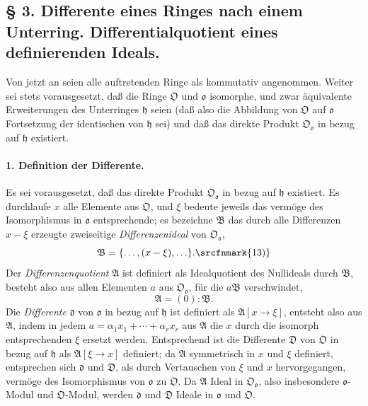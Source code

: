 \subsection*{§ 3. Differente eines Ringes nach einem Unterring. Differentialquotient eines definierenden Ideals.}

Von jetzt an seien alle auftretenden Ringe als kommutativ angenommen. Weiter sei stets vorausgesetzt, daß die Ringe $\mathfrak O$ und $\mathfrak o$ isomorphe, und zwar äquivalente Erweiterungen des Unterringes $\mathfrak h$ seien (daß also die Abbildung von $\mathfrak O$ auf $\mathfrak o$ Fortsetzung der identischen von $\mathfrak h$ sei) und daß das direkte Produkt $\mathfrak O_{\mathfrak o}$ in bezug auf $\mathfrak h$ existiert.

\paragraph{1. Definition der Differente.}
Es sei vorausgesetzt, daß das direkte Produkt $\mathfrak O_{\mathfrak o}$ in bezug auf $\mathfrak h$ existiert. Es durchlaufe $x$ alle Elemente aus $\mathfrak O$, und $\xi$ bedeute jeweils das vermöge des Isomorphismus in $\mathfrak o$ entsprechende; es bezeichne $\mathfrak B$ das durch alle Differenzen $x-\xi$ erzeugte zweiseitige \emph{Differenzenideal} von $\mathfrak O_{\mathfrak o}$,
\[
\mathfrak B=\{\ldots,(x-\xi),\ldots\}.\srcfnmark{13)}
\]
Der \emph{Differenzenquotient} $\mathfrak A$ ist definiert als Idealquotient des Nullideals durch $\mathfrak B$, besteht also aus allen Elementen $a$ aus $\mathfrak O_{\mathfrak o}$, für die $a\mathfrak B$ verschwindet,
\[
\mathfrak A=(0):\mathfrak B.
\]
Die \emph{Differente} $\mathfrak d$ von $\mathfrak o$ in bezug auf $\mathfrak h$ ist definiert als $\mathfrak A[x\to\xi]$, entsteht also aus $\mathfrak A$, indem in jedem $a=\alpha_1x_1+\cdots+\alpha_rx_r$ aus $\mathfrak A$ die $x$ durch die isomorph entsprechenden $\xi$ ersetzt werden. Entsprechend ist die Differente $\mathfrak D$ von $\mathfrak O$ in bezug auf $\mathfrak h$ als $\mathfrak A[\xi\to x]$ definiert; da $\mathfrak A$ symmetrisch in $x$ und $\xi$ definiert, entsprechen sich $\mathfrak d$ und $\mathfrak D$, als durch Vertauschen von $\xi$ und $x$ hervorgegangen, vermöge des Isomorphismus von $\mathfrak o$ zu $\mathfrak O$. Da $\mathfrak A$ Ideal in $\mathfrak O_{\mathfrak o}$, also insbesondere $\mathfrak o$-Modul und $\mathfrak O$-Modul, werden $\mathfrak d$ und $\mathfrak D$ Ideale in $\mathfrak o$ und $\mathfrak O$.

